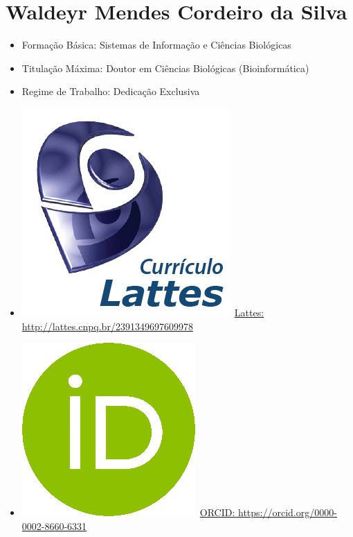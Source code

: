 \documentclass[11pt,fleqn]{book} %
\begin{document}
\section{Waldeyr Mendes Cordeiro da Silva}\label{WaldeyrMendes}
\begin{itemize}
	\item Formação Básica: Sistemas de Informação e Ciências Biológicas 
	\item Titulação Máxima: Doutor em Ciências Biológicas (Bioinformática)
	\item Regime de Trabalho: Dedicação Exclusiva
	\item \includegraphics[scale=.03]{Pictures/lattes}~\href{http://lattes.cnpq.br/2391349697609978}{Lattes: http://lattes.cnpq.br/2391349697609978}
	\item \includegraphics[scale=.15]{Pictures/orcid}~\href{https://orcid.org/0000-0002-8660-6331}{ORCID: https://orcid.org/0000-0002-8660-6331}
\end{itemize}

%
\end{document}
